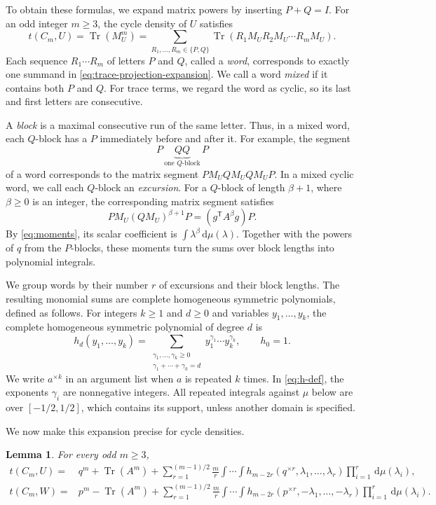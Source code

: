 \documentclass[11pt]{article}
\newtheorem{lemma}[theorem]{Lemma}
\theoremstyle{remark}
\numberwithin{equation}{section}
\newcommand{\Tr}{\operatorname{Tr}}
\newcommand{\dd}{\,\mathrm d}
\newcommand{\tC}[2]{t(C_{#1},#2)}
\newcommand{\rep}[2]{#1^{\times #2}}
\begin{document}
To obtain these formulas, we expand matrix powers by inserting $P+Q=I$.
For an odd integer $m\ge3$, the cycle density of $U$ satisfies
\begin{equation}\label{eq:trace-projection-expansion}
  \tC mU=\Tr(M_U^m)
  =\sum_{R_1,\ldots,R_m\in\{P,Q\}}
    \Tr(R_1M_UR_2M_U\cdots R_mM_U).
\end{equation}
Each sequence $R_1\cdots R_m$ of letters $P$ and $Q$, called a \emph{word}, corresponds to exactly one summand in \eqref{eq:trace-projection-expansion}.
We call a word \emph{mixed} if it contains both $P$ and $Q$.
For trace terms, we regard the word as cyclic, so its last and first letters are consecutive.

A \emph{block} is a maximal consecutive run of the same letter.
Thus, in a mixed word, each $Q$-block has a $P$ immediately before and after it.
For example, the segment
\[
  P\,\underbrace{QQ}_{\text{one $Q$-block}}\,P
\]
of a word corresponds to the matrix segment $P M_U Q M_U Q M_U P$.
In a mixed cyclic word, we call each $Q$-block an \emph{excursion}.
For a $Q$-block of length $\beta+1$, where $\beta\ge0$ is an integer, the corresponding matrix segment satisfies
\[
  P M_U(Q M_U)^{\beta+1}P=(g^{\mathsf T}A^\beta g)P.
\]
By \eqref{eq:moments}, its scalar coefficient is $\int\lambda^\beta\dd\mu(\lambda)$.
Together with the powers of $q$ from the $P$-blocks, these moments turn the sums over block lengths into polynomial integrals.

We group words by their number $r$ of excursions and their block lengths.
The resulting monomial sums are complete homogeneous symmetric polynomials, defined as follows.
For integers $k\ge1$ and $d\ge0$ and variables $y_1,\ldots,y_k$, the
complete homogeneous symmetric polynomial of degree $d$ is
\begin{equation}\label{eq:h-def}
  h_d(y_1,\ldots,y_k)
  =\sum_{\substack{\gamma_1,\ldots,\gamma_k\ge0\\
                    \gamma_1+\cdots+\gamma_k=d}}
   y_1^{\gamma_1}\cdots y_k^{\gamma_k},
  \qquad h_0=1.
\end{equation}
We write $\rep ak$ in an argument list when $a$ is repeated $k$ times.
In \eqref{eq:h-def}, the exponents $\gamma_i$ are nonnegative integers.
All repeated integrals against $\mu$ below are over $[-1/2,1/2]$,
which contains its support, unless another domain is specified.

We now make this expansion precise for cycle densities.

\begin{lemma}
\label{lem:cycle-excursions}
  For every odd $m\ge3$,
  \begin{align}
    \tC mU
    ={}&q^m+\Tr(A^m)
    +\sum_{r=1}^{(m-1)/2}\frac mr
      \int\!\cdots\!\int
      h_{m-2r}(\rep qr,\lambda_1,\ldots,\lambda_r)
      \prod_{i=1}^r\dd\mu(\lambda_i),
    \label{eq:cycle-U}\\
    \tC mW
    ={}&p^m-\Tr(A^m)
    +\sum_{r=1}^{(m-1)/2}\frac mr
      \int\!\cdots\!\int
      h_{m-2r}(\rep pr,-\lambda_1,\ldots,-\lambda_r)
      \prod_{i=1}^r\dd\mu(\lambda_i).
    \label{eq:cycle-W}
  \end{align}
\end{lemma}
\end{document}
